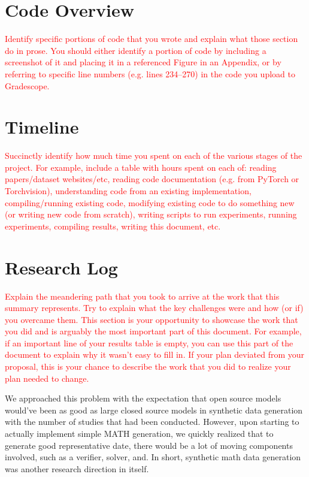 \documentclass[twocolumn,11pt]{article}
\begin{document}
\section{Code Overview}
\textcolor{red}{Identify specific portions of code that you wrote and explain what
those section do in prose. You should either identify a portion of code by including a screenshot
of it and placing it in a referenced Figure in an Appendix, or by referring to specific line numbers
(e.g. lines 234–270) in the code you upload to Gradescope.}

\section{Timeline}
\textcolor{red}{Succinctly identify how much time you spent on each of the various stages
of the project. For example, include a table with hours spent on each of: reading papers/dataset
websites/etc, reading code documentation (e.g. from PyTorch or Torchvision), understanding
code from an existing implementation, compiling/running existing code, modifying existing
code to do something new (or writing new code from scratch), writing scripts to run experiments, running experiments, compiling results, writing this document, etc.}

\section{Research Log}
\textcolor{red}{Explain the meandering path that you took to arrive at the work that
this summary represents. Try to explain what the key challenges were and how (or if) you
overcame them. This section is your opportunity to showcase the work that you did and is
arguably the most important part of this document. For example, if an important line of your
results table is empty, you can use this part of the document to explain why it wasn’t easy to fill
in. If your plan deviated from your proposal, this is your chance to describe the work that you
did to realize your plan needed to change.}

We approached this problem with the expectation that open source models would've been as good as large closed source models in synthetic data generation with the number of studies that had been conducted. However, upon starting to actually implement simple MATH generation, we quickly realized that to generate good representative date, there would be a lot of moving components involved, such as a verifier, solver, and. In short, synthetic math data generation was another research direction in itself. 
\end{document}
